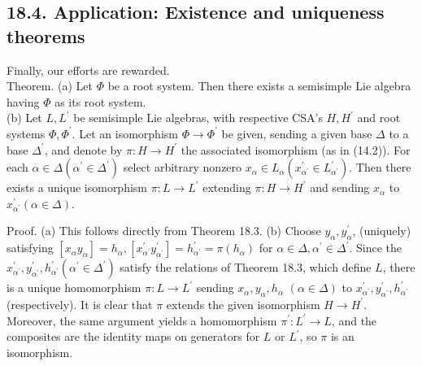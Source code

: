 \documentclass[10pt]{article}
\begin{document}
\subsection*{18.4. Application: Existence and uniqueness theorems}
Finally, our efforts are rewarded.\\
Theorem. (a) Let $\Phi$ be a root system. Then there exists a semisimple Lie algebra having $\Phi$ as its root system.\\
(b) Let $L, L^{\prime}$ be semisimple Lie algebras, with respective CSA's $H, H^{\prime}$ and root systems $\Phi, \Phi^{\prime}$. Let an isomorphism $\Phi \rightarrow \Phi^{\prime}$ be given, sending a given base $\Delta$ to a base $\Delta^{\prime}$, and denote by $\pi: H \rightarrow H^{\prime}$ the associated isomorphism (as in (14.2)). For each $\alpha \in \Delta\left(\alpha^{\prime} \in \Delta^{\prime}\right)$ select arbitrary nonzero $x_{\alpha} \in L_{\alpha}\left(x_{\alpha^{\prime}}^{\prime} \in L_{\alpha^{\prime}}^{\prime}\right)$. Then there exists a unique isomorphism $\pi: L \rightarrow L^{\prime}$ extending $\pi: H \rightarrow H^{\prime}$ and sending $x_{\alpha}$ to $x_{\alpha^{\prime}}^{\prime}(\alpha \in \Delta)$.

Proof. (a) This follows directly from Theorem 18.3. (b) Choose $y_{\alpha}, y_{\alpha}^{\prime}$, (uniquely) satisfying $\left[x_{\alpha} y_{\alpha}\right]=h_{\alpha},\left[x_{\alpha^{\prime}}^{\prime} y_{\alpha^{\prime}}^{\prime}\right]=h_{\alpha^{\prime}}^{\prime}=\pi\left(h_{\alpha}\right)$ for $\alpha \in \Delta, \alpha^{\prime} \in \Delta^{\prime}$. Since the $x_{\alpha^{\prime}}^{\prime}, y_{\alpha^{\prime}}^{\prime}, h_{\alpha^{\prime}}^{\prime}\left(\alpha^{\prime} \in \Delta^{\prime}\right)$ satisfy the relations of Theorem 18.3, which define $L$, there is a unique homomorphism $\pi: L \rightarrow L^{\prime}$ sending $x_{\alpha}, y_{\alpha}, h_{\alpha}$ $(\alpha \in \Delta)$ to $x_{\alpha^{\prime}}^{\prime}, y_{\alpha^{\prime}}^{\prime}, h_{\alpha^{\prime}}^{\prime}$ (respectively). It is clear that $\pi$ extends the given isomorphism $H \rightarrow H^{\prime}$. Moreover, the same argument yields a homomorphism $\pi^{\prime}: L^{\prime} \rightarrow L$, and the composites are the identity maps on generators for $L$ or $L^{\prime}$, so $\pi$ is an isomorphism.
\end{document}
